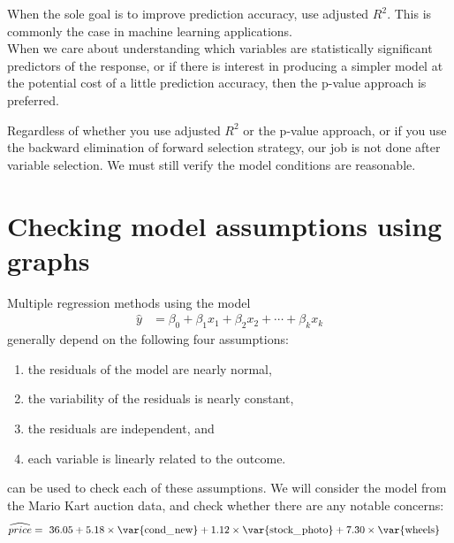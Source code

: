 \begin{tipBox}{
When the sole goal is to improve prediction accuracy, use adjusted $R^2$. This is commonly the case in machine learning applications.\\[-2mm]

When we care about understanding which variables are statistically significant predictors of the response, or if there is interest in producing a simpler model at the potential cost of a little prediction accuracy, then the p-value approach is preferred.}
\end{tipBox}

Regardless of whether you use adjusted $R^2$ or the p-value approach, or if you use the backward elimination of forward selection strategy, our job is not done after variable selection. We must still verify the model conditions are reasonable.




\section[Checking model assumptions using graphs]{Checking model assumptions using graphs }
\label{multipleRegressionModelAssumptions}


Multiple regression methods using the model
\begin{align*}
\hat{y} &= \beta_0 + \beta_1x_1 + \beta_2x_2 + \cdots + \beta_kx_k
\end{align*}
generally depend on the following four assumptions:
\begin{enumerate}
\setlength{\itemsep}{0mm}
\item the residuals of the model are nearly normal,
\item the variability of the residuals is nearly constant,
\item the residuals are independent, and
\item each variable is linearly related to the outcome.
\end{enumerate}
 can be used to check each of these assumptions. We will consider the model from the Mario Kart auction data, and check whether there are any notable concerns:
\begin{align*}
\widehat{price} &= \ 36.05 + 5.18 \times \text{\var{cond\_\hspace{0.3mm}new}} + 1.12 \times \text{\var{stock\_\hspace{0.3mm}photo}} + 7.30 \times \text{\var{wheels}}
\end{align*}

